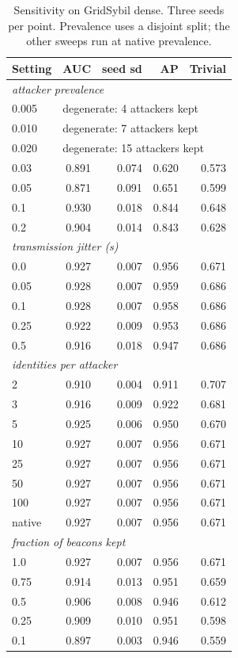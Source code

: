 \documentclass[journal,twoside]{IEEEtran}
\begin{document}
\begin{table}[t]
\caption{Sensitivity on GridSybil dense. Three seeds per point.
Prevalence uses a disjoint split; the other sweeps run at native prevalence.}
\label{tab:sensitivity}
\centering
\footnotesize
\begin{tabular}{lrrrr}
\toprule
Setting & AUC & seed sd & AP & Trivial \\
\midrule
\multicolumn{5}{l}{\emph{attacker prevalence}} \\
0.005 & \multicolumn{4}{l}{degenerate: 4 attackers kept} \\
0.010 & \multicolumn{4}{l}{degenerate: 7 attackers kept} \\
0.020 & \multicolumn{4}{l}{degenerate: 15 attackers kept} \\
0.03 & 0.891 & 0.074 & 0.620 & 0.573 \\
0.05 & 0.871 & 0.091 & 0.651 & 0.599 \\
0.1 & 0.930 & 0.018 & 0.844 & 0.648 \\
0.2 & 0.904 & 0.014 & 0.843 & 0.628 \\
\midrule
\multicolumn{5}{l}{\emph{transmission jitter (s)}} \\
0.0 & 0.927 & 0.007 & 0.956 & 0.671 \\
0.05 & 0.928 & 0.007 & 0.959 & 0.686 \\
0.1 & 0.928 & 0.007 & 0.958 & 0.686 \\
0.25 & 0.922 & 0.009 & 0.953 & 0.686 \\
0.5 & 0.916 & 0.018 & 0.947 & 0.686 \\
\midrule
\multicolumn{5}{l}{\emph{identities per attacker}} \\
2 & 0.910 & 0.004 & 0.911 & 0.707 \\
3 & 0.916 & 0.009 & 0.922 & 0.681 \\
5 & 0.925 & 0.006 & 0.950 & 0.670 \\
10 & 0.927 & 0.007 & 0.956 & 0.671 \\
25 & 0.927 & 0.007 & 0.956 & 0.671 \\
50 & 0.927 & 0.007 & 0.956 & 0.671 \\
100 & 0.927 & 0.007 & 0.956 & 0.671 \\
native & 0.927 & 0.007 & 0.956 & 0.671 \\
\midrule
\multicolumn{5}{l}{\emph{fraction of beacons kept}} \\
1.0 & 0.927 & 0.007 & 0.956 & 0.671 \\
0.75 & 0.914 & 0.013 & 0.951 & 0.659 \\
0.5 & 0.906 & 0.008 & 0.946 & 0.612 \\
0.25 & 0.909 & 0.010 & 0.951 & 0.598 \\
0.1 & 0.897 & 0.003 & 0.946 & 0.559 \\
\bottomrule
\end{tabular}
\end{table}
\end{document}
